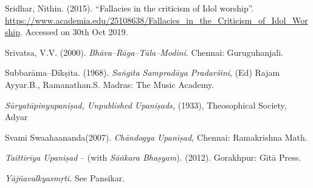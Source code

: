 \begin{thebibliography}{99}
  Sridhar, Nithin. (2015). “Fallacies in the criticism of Idol worship”. \url{https://www.academia.edu/25108638/Fallacies_in_the_Criticism_of_Idol_Worship}. Accessed on 30th Oct 2019.

  Srivatsa, V.V. (2000). \textit{Bhāva–Rāga–Tāla–Modini}. Chennai: Guruguhanjali.

  Subbarāma–Dīkṣita. (1968). \textit{Saṅgīta Sampradāya Pradarśini}, (Ed) Rajam Ayyar.B., Ramanathan.S. Madras: The Music Academy.

  \textit{Sūryatāpinyupaniṣad, Unpublished Upaniṣads,} (1933), Theosophical Society, Adyar

  Svami Swaahaananda(2007).\textit{ Chāndogya Upaniṣad,} Chennai: Rama\-krishna Math.

  \textit{Taittirīya Upaniṣad} – (with \textit{Sāṅkara Bhaṣyam}). (2012). Gorakhpur: Gītā Press.

  \textit{Yājñavalkyasmṛti.} See Pansikar.

 \end{thebibliography}

